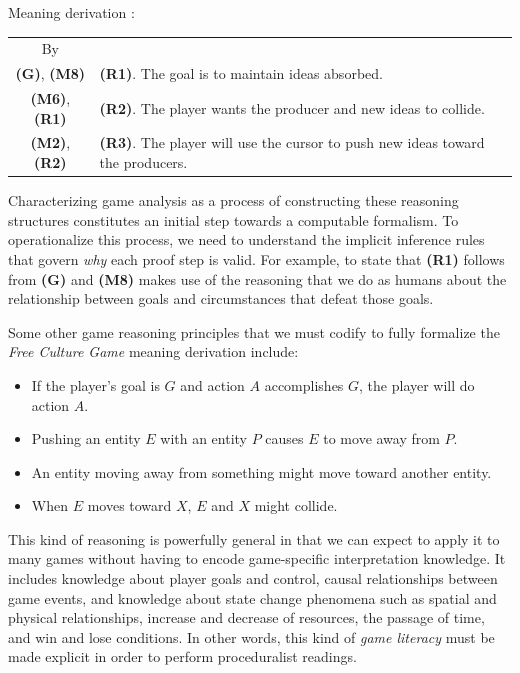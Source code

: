 \documentclass[12pt]{report}
\begin{document}
Meaning derivation  :

\begin{tabular}{cp{6.5cm}}
 By & \\
 \textbf{(G)}, \textbf{(M8)} & \textbf{(R1)}. The goal is to maintain ideas absorbed.\\
 \textbf{(M6)}, \textbf{(R1)} & \textbf{(R2)}. The player wants the producer and new ideas to collide.\\
 \textbf{(M2)}, \textbf{(R2)} & \textbf{(R3)}. The player will use the cursor to push new ideas toward the
producers.
\end{tabular}



Characterizing game analysis as a process of constructing these
reasoning structures constitutes an initial step towards a computable
formalism. To operationalize this process, we need to understand the
implicit inference rules that govern {\em why} each proof step is valid.
For example, to state that \textbf{(R1)} follows from \textbf{(G)} and \textbf{(M8)} makes use of the
reasoning that we do as humans about the relationship between goals and
circumstances that defeat those goals.

Some other game reasoning principles that we must codify to fully formalize
the {\em Free Culture Game} meaning derivation include:

\begin{itemize}
\item If the player's goal is $G$ and action $A$ accomplishes $G$, the player will do action $A$.
\item Pushing an entity $E$ with an entity $P$ causes $E$ to move away from $P$.
\item An entity moving away from something might move toward another entity.
\item When $E$ moves toward $X$, $E$ and $X$ might collide.
\end{itemize}

This kind of reasoning is powerfully general in that we can expect to apply
it to many games without having to encode game-specific interpretation knowledge. 
It includes knowledge about player goals and control, causal relationships
between game events, and knowledge about state change phenomena such as
spatial and physical relationships, increase and decrease of resources, the
passage of time, and win and lose conditions. In other words, this kind of
{\em game literacy} must be made explicit in order to perform proceduralist readings.  
\end{document}
